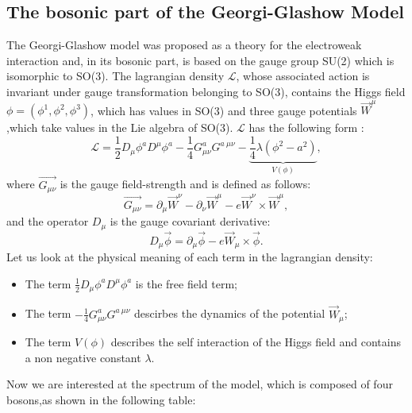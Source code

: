 \subsection{The bosonic part of the Georgi-Glashow Model}
The Georgi-Glashow model was proposed as a theory for the electroweak interaction and, in its bosonic part, is based on the gauge group SU(2) which is isomorphic to SO(3).
The lagrangian density $\mathcal{L}$, whose associated action is invariant under gauge transformation belonging to SO(3), contains the Higgs field $\phi = ( \phi^1, \phi^2 , \phi^3)$, which has values in SO(3) and three gauge potentials $\Vec{W}^\mu$,which take values in the Lie algebra of SO(3). 
$\mathcal{L}$ has the following form : 
\begin{equation}
\mathcal{L}= \frac{1}{2}D_{\mu}\phi^a D^\mu \phi^a  -\frac{1}{4} G_{\mu \nu}^a G^{a \ \mu \nu} - \underbrace{\frac{1}{4}\lambda (\phi^2 -a^2)}_{V(\phi)},
\end{equation}
where $\Vec{G_{\mu \nu}}$ is the gauge field-strength and is defined as follows:
\begin{equation}
\Vec{G_{\mu \nu}} = \partial_{\mu}  \Vec{W}^\nu -\partial_{\nu}  \Vec{W}^\mu - e \Vec{W}^\nu \times \Vec{W}^\mu,
\end{equation}
and the operator $D_{\mu}$ is the gauge covariant derivative: 
\begin{equation}
D_\mu \Vec{\phi} = \partial_\mu \Vec{\phi} - e \Vec{W}_\mu \times \Vec{\phi}.
\end{equation}
Let us look at the physical meaning of each term in the lagrangian density:
\begin{itemize}
    \item The term $\frac{1}{2}D_{\mu}\phi^a D^\mu \phi^a $ is the free field term;
    \item The term  $-\frac{1}{4} G_{\mu \nu}^a G^{a \ \mu \nu}$ descirbes the dynamics of the potential $\Vec{W}_{\mu}$;
    \item The term  $V(\phi) $ describes the self interaction of the Higgs field and contains a non negative constant $\lambda$.
\end{itemize}

Now we are interested at the spectrum of the model, which is composed of four bosons,as shown in the following table:

